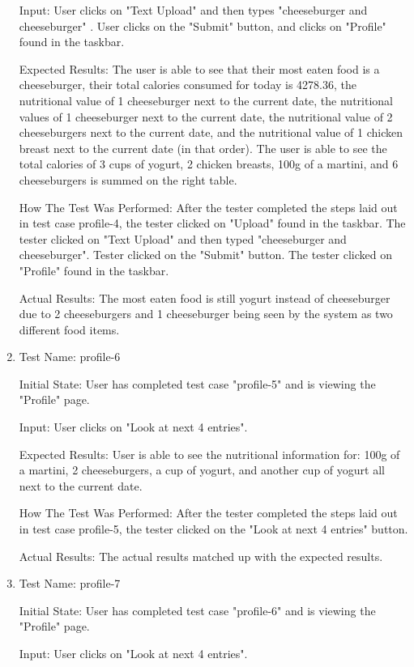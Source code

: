 \documentclass[12pt, titlepage]{article}
\begin{document}
\begin{enumerate}
		Input: User clicks on "Text Upload" and then types "cheeseburger and cheeseburger" . User clicks on the "Submit" button, and clicks on "Profile" found in the taskbar.
		
		Expected Results: The user is able to see that their most eaten food is a cheeseburger, their total calories consumed for today is 4278.36, the nutritional value of 1 cheeseburger next to the current date, the nutritional values of 1 cheeseburger next to the current date, the nutritional value of 2 cheeseburgers next to the current date, and the nutritional value of 1 chicken breast next to the current date (in that order). The user is able to see the total calories of 3 cups of yogurt, 2 chicken breasts, 100g of a martini, and 6 cheeseburgers is summed on the right table.
		
		How The Test Was Performed: After the tester completed the steps laid out in test case profile-4, the tester clicked on "Upload" found in the taskbar. The tester clicked on "Text Upload" and then typed "cheeseburger and cheeseburger". Tester clicked on the "Submit" button. The tester clicked on "Profile" found in the taskbar.
		
		Actual Results: The most eaten food is still yogurt instead of cheeseburger due to 2 cheeseburgers and 1 cheeseburger being seen by the system as two different food items.
		
		\item{Test Name: profile-6}
		
		Initial State: User has completed test case "profile-5" and is viewing the "Profile" page.
		
		Input: User clicks on "Look at next 4 entries".
		
		Expected Results: User is able to see the nutritional information for: 100g of a martini, 2 cheeseburgers, a cup of yogurt, and another cup of yogurt all next to the current date.
		
		How The Test Was Performed: After the tester completed the steps laid out in test case profile-5, the tester clicked on the "Look at next 4 entries" button.
		
		Actual Results: The actual results matched up with the expected results.
		
		\item{Test Name: profile-7}
		
		Initial State: User has completed test case "profile-6" and is viewing the "Profile" page.
		
		Input: User clicks on "Look at next 4 entries".
		

\end{enumerate}
\end{document}
